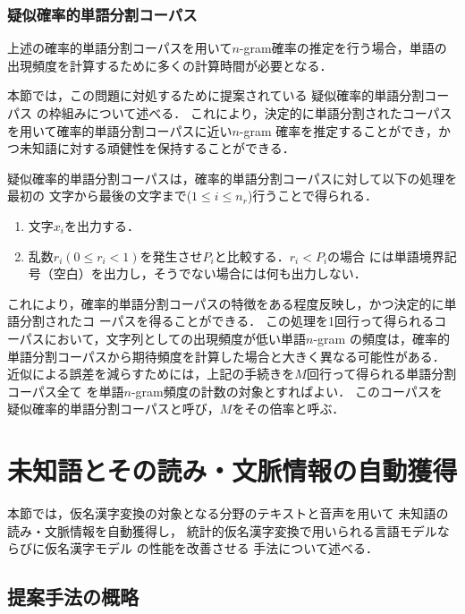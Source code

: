 \documentclass[japanese]{jnlp_1.4}
\begin{document}
\subsubsection{疑似確率的単語分割コーパス}
\label{subsubsection:P-SSC}

上述の確率的単語分割コーパスを用いて$n$-gram確率の推定を行う場合，単語の出現頻度を計算するために多くの計算時間が必要となる．

本節では，この問題に対処するために提案されている
疑似確率的単語分割コーパス
\cite{擬似確率的単語分割コーパスによる言語モデルの改良}
の枠組みについて述べる．
これにより，決定的に単語分割されたコーパスを用いて確率的単語分割コーパスに近い$n$-gram
確率を推定することができ，かつ未知語に対する頑健性を保持することができる．

疑似確率的単語分割コーパスは，確率的単語分割コーパスに対して以下の処理を最初の
文字から最後の文字まで($1 \leq i \leq n_{r}$)行うことで得られる．
\begin{enumerate}

\item 文字$x_{i}$を出力する．

\item 乱数$r_{i} (0 \leq r_{i} < 1)$を発生させ$P_{i}$と比較する．$r_{i} < P_{i}$の場合
      には単語境界記号（空白）を出力し，そうでない場合には何も出力しない．

\end{enumerate}
これにより，確率的単語分割コーパスの特徴をある程度反映し，かつ決定的に単語分割されたコ
ーパスを得ることができる．
この処理を1回行って得られるコーパスにおいて，文字列としての出現頻度が低い単語$n$-gram
の頻度は，確率的単語分割コーパスから期待頻度を計算した場合と大きく異なる可能性がある．
近似による誤差を減らすためには，上記の手続きを$M$回行って得られる単語分割コーパス全て
を単語$n$-gram頻度の計数の対象とすればよい．
このコーパスを
疑似確率的単語分割コーパスと呼び，$M$をその倍率と呼ぶ．



\section{未知語とその読み・文脈情報の自動獲得}
\label{sect3_Ext}

本節では，仮名漢字変換の対象となる分野のテキストと音声を用いて
未知語の読み・文脈情報を自動獲得し，
統計的仮名漢字変換で用いられる言語モデルならびに仮名漢字モデル
の性能を改善させる
手法について述べる．



\subsection{提案手法の概略}
\label{subsect:ext_overview}
\end{document}
